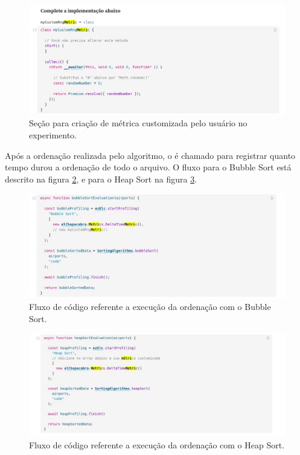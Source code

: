 \documentclass[12pt]{tcc}
\begin{document}
\begin{figure}[!ht]
	\centering
	\includegraphics[width=1\textwidth]{figures/experimento-metrica.jpeg}
	\caption{Seção para criação de métrica customizada pelo usuário no experimento.}
	\label{fig:metrica-observable}
\end{figure}


Após a ordenação realizada pelo algoritmo, o  é chamado para registrar quanto tempo durou a ordenação de todo o arquivo. O fluxo para o Bubble Sort está descrito na figura \ref{fig:experimento-bubble}, e para o Heap Sort na figura \ref{fig:experimento-heap}.

\begin{figure}[!ht]
	\centering
	\includegraphics[width=1\textwidth]{figures/experimento-bubble.jpeg}
	\caption{Fluxo de código referente a execução da ordenação com o Bubble Sort.}
	\label{fig:experimento-bubble}
\end{figure}

\begin{figure}[!ht]
	\centering
	\includegraphics[width=1\textwidth]{figures/experimento-heap.jpeg}
	\caption{Fluxo de código referente a execução da ordenação com o Heap Sort.}
	\label{fig:experimento-heap}
\end{figure}
\end{document}
